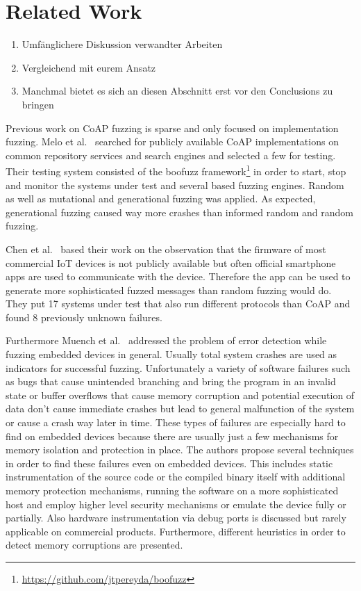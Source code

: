 \section{Related Work}
\label{section:related_work}

\begin{enumerate}
	\item Umfänglichere Diskussion verwandter Arbeiten
	\item Vergleichend mit eurem Ansatz
	\item Manchmal bietet es sich an diesen Abschnitt erst vor den Conclusions zu bringen
\end{enumerate}

Previous work on CoAP fuzzing is sparse and only focused on implementation fuzzing. Melo et al.~\cite{Melo2017RobustnessTO} searched for publicly available CoAP implementations on common repository services and search engines and selected a few for testing. Their testing system consisted of the boofuzz framework\footnote{\url{https://github.com/jtpereyda/boofuzz}} in order to start, stop and monitor the systems under test and several \scapy based fuzzing engines. Random as well as mutational and generational fuzzing was applied. As expected, generational fuzzing caused way more crashes than informed random and random fuzzing.

Chen et al.~\cite{chen2018ndss} based their work on the observation that the firmware of most commercial IoT devices is not publicly available but often official smartphone apps are used to communicate with the device. Therefore the app can be used to generate more sophisticated fuzzed messages than random fuzzing would do. They put 17 systems under test that also run different protocols than CoAP and found 8 previously unknown failures.

Furthermore Muench et al.~\cite{EURECOM+5417} addressed the problem of error detection while fuzzing embedded devices in general. Usually total system crashes are used as indicators for successful fuzzing. Unfortunately a variety of software failures such as bugs that cause unintended branching and bring the program in an invalid state or buffer overflows that cause memory corruption and potential execution of data don't cause immediate crashes but lead to general malfunction of the system or cause a crash way later in time. These types of failures are especially hard to find on embedded devices because there are usually just a few mechanisms for memory isolation and protection in place. The authors propose several techniques in order to find these failures even on embedded devices. This includes static instrumentation of the source code or the compiled binary itself with additional memory protection mechanisms, running the software on a more sophisticated host and employ higher level security mechanisms or emulate the device fully or partially. Also hardware instrumentation via debug ports is discussed but rarely applicable on commercial products. Furthermore, different heuristics in order to detect memory corruptions are presented.

